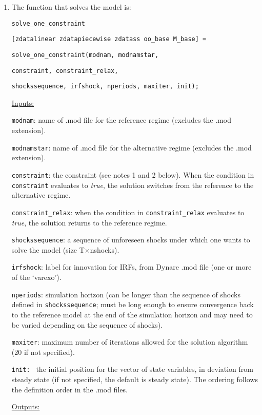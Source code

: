 \documentclass[12pt]{article}
\begin{document}
\begin{enumerate}
\item The function that solves the model is:

\texttt{solve\_one\_constraint}

\texttt{[zdatalinear zdatapiecewise zdatass oo\_base M\_base] = }

\texttt{solve\_one\_constraint(modnam, modnamstar, }

\texttt{constraint, constraint\_relax, }

\texttt{shockssequence, irfshock, nperiods, maxiter, init);}

\medskip

\underline{Inputs:}

\texttt{modnam}: name of .mod file for the reference regime (excludes the
.mod extension).

\texttt{modnamstar}: name of .mod file for the alternative regime (excludes
the .mod extension).

\texttt{constraint}: the constraint (see notes 1 and 2 below). When the
condition in \texttt{constraint} evaluates to \emph{true}, the solution
switches from the reference to the alternative regime.

\texttt{constraint\_relax}: when the condition in \texttt{constraint\_relax}
evaluates to \emph{true}, the solution returns to the reference regime.

\texttt{shockssequence}: a sequence of unforeseen shocks under which one
wants to solve the model (size T$\times $nshocks).

\texttt{irfshock}: label for innovation for IRFs, from Dynare .mod file (one
or more of the `varexo').

\texttt{nperiods}: simulation horizon (can be longer than the sequence of
shocks defined in \texttt{shockssequence}; must be long enough to ensure
convergence back to the reference model at the end of the simulation horizon
and may need to be varied depending on the sequence of shocks).

\texttt{maxiter}: maximum number of iterations allowed for the solution
algorithm (20 if not specified).

\texttt{init: } the initial position for the vector of state variables, in
deviation from steady state (if not specified, the default is steady state).
The ordering follows the definition order in the .mod files.

\medskip

\underline{Outputs:}


\end{enumerate}
\end{document}
